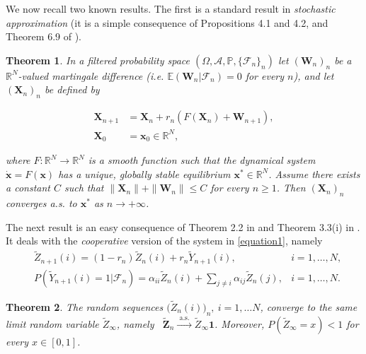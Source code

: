 \documentclass[article,12pt]{article}
\theoremstyle{plain}
\newtheorem{theorem}{Theorem}[section]
\theoremstyle{definition}
\theoremstyle{remark}
\numberwithin{equation}{section}
\numberwithin{theorem}{section}
\newcommand{\R}{\mathbb R}
\begin{document}
		We now recall two known results. The first is a standard result in {\em stochastic approximation} (it is a simple consequence of Propositions 4.1 and 4.2, and Theorem 6.9 of \cite{Benaim99}).
		\begin{theorem} \label{benaim}
			In a filtered probability space $(\Omega, \mathcal{A}, \mathbb{P}, \{\mathcal{F}_n\}_{n})$ let $(\mathbf{W}_n)_{n}$ be a $\mathbb{R}^N$-valued martingale difference (i.e. $\mathbb{E}(\mathbf{W}_n|\mathcal{F}_n) = 0$ for every $n$), and let $(\mathbf{X}_n)_{n}$ be defined by
			
			
			\[
			\begin{split}
				\mathbf{X}_{n+1} & = \mathbf{X}_n + r_n\left( F(\mathbf{X}_n) + \mathbf{W}_{n+1} \right), \\
				\mathbf{X}_0 & = \mathbf{x}_0 \in \R^N,
			\end{split}
			\]
			
			where $F:\R^N \rightarrow \R^N$ is a smooth function such that the dynamical system $\dot{\mathbf{x}} = F(\mathbf{x})$ has a unique, globally stable equilibrium $\mathbf{x}^* \in \mathbb{R}^N$. Assume there exists a constant $C$ such that $\|\mathbf{X}_n\| + \| \mathbf{W}_n\| \leq C$ for every $n \geq 1$. Then $(\mathbf{X}_n)_n$ converges a.s. to $\mathbf{x}^*$ as $n \rightarrow +\infty$.
		\end{theorem}
		
		The next result is an easy consequence of Theorem 2.2 in \cite{aletti2024networks} and Theorem 3.3(i) in \cite{aletti2024networksProb}. It deals with the {\em cooperative} version of the system in \eqref{equation1}, namely
		\begin{align} \label{equation2}
			&\tilde{Z}_{n+1}(i)=(1-r_n)\tilde{Z}_n(i) + r_n \tilde{Y}_{n+1}(i), &i=1,\ldots, N,\\
			&P\left(\tilde{Y}_{n+1}(i)=1|\mathcal{F}_n\right) = \alpha_{ii}\tilde{Z}_n(i)+ \sum_{j\neq i}\alpha_{ij} \tilde{Z}_n(j),  &i=1,\ldots, N.\nonumber
		\end{align} 
		
		\begin{theorem}\label{convergenceCoop}
			The random sequences $\big(\tilde{Z}_{n}(i)\big)_{n},  \ i=1,\ldots N$,  converge to the same limit random variable $\tilde{Z}_{\infty}$, namely \, $
			\mathbf{\tilde{Z}}_n \xrightarrow{\text { a.s. }} \tilde{Z}_{\infty} \mathbf{1}
			$. Moreover, $P(\tilde{Z}_\infty=x)<1$ for every $x\in [0,1]$.
			
		\end{theorem}
		
\end{document}
